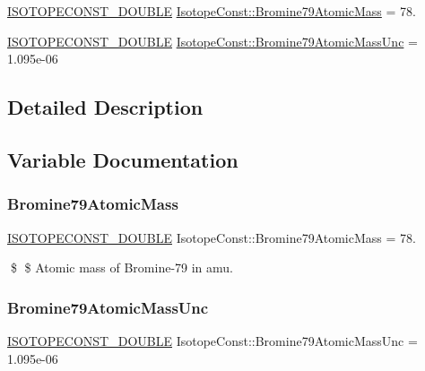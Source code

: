 \begin{DoxyCompactItemize}
\item 
\mbox{\hyperlink{group___isotope_const-_macros_ga8f45a7272ce02c0b4c65c44636ed719a}{I\+S\+O\+T\+O\+P\+E\+C\+O\+N\+S\+T\+\_\+\+D\+O\+U\+B\+LE}} \mbox{\hyperlink{group___isotope_const-_bromine-_br79_ga8793c4dd2ce7598196da358295524efd}{Isotope\+Const\+::\+Bromine79\+Atomic\+Mass}} = 78.
\item 
\mbox{\hyperlink{group___isotope_const-_macros_ga8f45a7272ce02c0b4c65c44636ed719a}{I\+S\+O\+T\+O\+P\+E\+C\+O\+N\+S\+T\+\_\+\+D\+O\+U\+B\+LE}} \mbox{\hyperlink{group___isotope_const-_bromine-_br79_gac6fb81a0c5399f1ff422586020d3c74e}{Isotope\+Const\+::\+Bromine79\+Atomic\+Mass\+Unc}} = 1.\+095e-\/06
\end{DoxyCompactItemize}


\subsection{Detailed Description}


\subsection{Variable Documentation}
\mbox{\label{group___isotope_const-_bromine-_br79_ga8793c4dd2ce7598196da358295524efd}} 
\subsubsection{\texorpdfstring{Bromine79\+Atomic\+Mass}{Bromine79AtomicMass}}
{\footnotesize\ttfamily \mbox{\hyperlink{group___isotope_const-_macros_ga8f45a7272ce02c0b4c65c44636ed719a}{I\+S\+O\+T\+O\+P\+E\+C\+O\+N\+S\+T\+\_\+\+D\+O\+U\+B\+LE}} Isotope\+Const\+::\+Bromine79\+Atomic\+Mass = 78.}

\$ \$ Atomic mass of Bromine-\/79 in amu. \mbox{\label{group___isotope_const-_bromine-_br79_gac6fb81a0c5399f1ff422586020d3c74e}} 
\subsubsection{\texorpdfstring{Bromine79\+Atomic\+Mass\+Unc}{Bromine79AtomicMassUnc}}
{\footnotesize\ttfamily \mbox{\hyperlink{group___isotope_const-_macros_ga8f45a7272ce02c0b4c65c44636ed719a}{I\+S\+O\+T\+O\+P\+E\+C\+O\+N\+S\+T\+\_\+\+D\+O\+U\+B\+LE}} Isotope\+Const\+::\+Bromine79\+Atomic\+Mass\+Unc = 1.\+095e-\/06}

